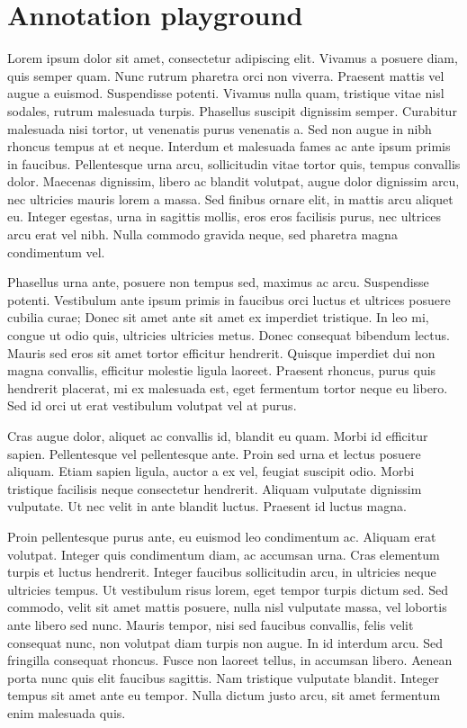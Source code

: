 \documentclass{article}
\begin{document}

\chapter{Annotation playground}




Lorem ipsum dolor sit amet, consectetur adipiscing elit. Vivamus a posuere diam, quis semper quam. Nunc rutrum pharetra orci non viverra. Praesent mattis vel augue a euismod. Suspendisse potenti. Vivamus nulla quam, tristique vitae nisl sodales, rutrum malesuada turpis. Phasellus suscipit dignissim semper. Curabitur malesuada nisi tortor, ut venenatis purus venenatis a. Sed non augue in nibh rhoncus tempus at et neque. Interdum et malesuada fames ac ante ipsum primis in faucibus. Pellentesque urna arcu, sollicitudin vitae tortor quis, tempus convallis dolor. Maecenas dignissim, libero ac blandit volutpat, augue dolor dignissim arcu, nec ultricies mauris lorem a massa. Sed finibus ornare elit, in mattis arcu aliquet eu. Integer egestas, urna in sagittis mollis, eros eros facilisis purus, nec ultrices arcu erat vel nibh. Nulla commodo gravida neque, sed pharetra magna condimentum vel.

Phasellus urna ante, posuere non tempus sed, maximus ac arcu. Suspendisse potenti. Vestibulum ante ipsum primis in faucibus orci luctus et ultrices posuere cubilia curae; Donec sit amet ante sit amet ex imperdiet tristique. In leo mi, congue ut odio quis, ultricies ultricies metus. Donec consequat bibendum lectus. Mauris sed eros sit amet tortor efficitur hendrerit. Quisque imperdiet dui non magna convallis, efficitur molestie ligula laoreet. Praesent rhoncus, purus quis hendrerit placerat, mi ex malesuada est, eget fermentum tortor neque eu libero. Sed id orci ut erat vestibulum volutpat vel at purus.

Cras augue dolor, aliquet ac convallis id, blandit eu quam. Morbi id efficitur sapien. Pellentesque vel pellentesque ante. Proin sed urna et lectus posuere aliquam. Etiam sapien ligula, auctor a ex vel, feugiat suscipit odio. Morbi tristique facilisis neque consectetur hendrerit. Aliquam vulputate dignissim vulputate. Ut nec velit in ante blandit luctus. Praesent id luctus magna.

Proin pellentesque purus ante, eu euismod leo condimentum ac. Aliquam erat volutpat. Integer quis condimentum diam, ac accumsan urna. Cras elementum turpis et luctus hendrerit. Integer faucibus sollicitudin arcu, in ultricies neque ultricies tempus. Ut vestibulum risus lorem, eget tempor turpis dictum sed. Sed commodo, velit sit amet mattis posuere, nulla nisl vulputate massa, vel lobortis ante libero sed nunc. Mauris tempor, nisi sed faucibus convallis, felis velit consequat nunc, non volutpat diam turpis non augue. In id interdum arcu. Sed fringilla consequat rhoncus. Fusce non laoreet tellus, in accumsan libero. Aenean porta nunc quis elit faucibus sagittis. Nam tristique vulputate blandit. Integer tempus sit amet ante eu tempor. Nulla dictum justo arcu, sit amet fermentum enim malesuada quis.
\end{document}
